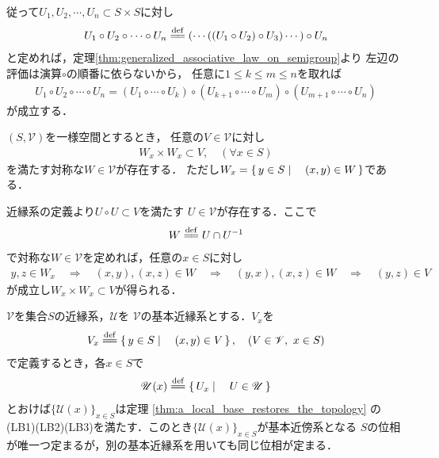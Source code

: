 	従って$U_1,U_2,\cdots,U_n \subset S \times S$に対し
	\begin{align}
		U_1 \circ U_2 \circ \cdots \circ U_n
		\defeq (\cdots((U_1 \circ U_2) \circ U_3) \cdots ) \circ U_n
	\end{align}
	と定めれば，定理\ref{thm:generalized_associative_law_on_semigroup}より
	左辺の評価は演算$\circ$の順番に依らないから，
	任意に$1 \leq k \leq m \leq n$を取れば
	\begin{align}
		U_1 \circ U_2 \circ \cdots \circ U_n
		= (U_1 \circ \cdots \circ U_k) 
		\circ (U_{k+1} \circ \cdots \circ U_m)
		\circ (U_{m+1} \circ \cdots \circ U_n)
	\end{align}
	が成立する．
	
	\begin{screen}
		\begin{thm}\label{thm:uniform_structure}
			$(S,\mathscr{V})$を一様空間とするとき，
			任意の$V \in \mathscr{V}$に対し
			\begin{align}
				W_x \times W_x \subset V,\quad (\forall x \in S)
			\end{align}
			を満たす対称な$W \in \mathscr{V}$が存在する．
			ただし$W_x = \left\{\, y \in S \mid \quad (x,y) \in W\, \right\}$である．
		\end{thm}
	\end{screen}
	
	\begin{prf}
		近縁系の定義より$U \circ U \subset V$を満たす
		$U \in \mathscr{V}$が存在する．ここで
		\begin{align}
			W \defeq U \cap U^{-1}
		\end{align}
		で対称な$W \in \mathscr{V}$を定めれば，任意の$x \in S$に対し
		\begin{align}
			y,z \in W_x \quad \Longrightarrow \quad
			(x,y),(x,z) \in W \quad \Longrightarrow \quad
			(y,x),(x,z) \in W \quad \Longrightarrow \quad
			(y,z) \in V
		\end{align}
		が成立し$W_x \times W_x \subset V$が得られる．
		\QED
	\end{prf}
	
	\begin{screen}
		\begin{thm}[近縁系で導入する位相]\label{thm:topology_induced_by_the_uniformity}
			$\mathscr{V}$を集合$S$の近縁系，$\mathscr{U}$を
			$\mathscr{V}$の基本近縁系とする．$V_x$を
			\begin{align}
				V_x \defeq \Set{y \in S}{(x,y) \in V},
				\quad (V \in \mathscr{V},\ x \in S)
			\end{align}
			で定義するとき，各$x \in S$で
			\begin{align}
				\mathscr{U}(x) \defeq \Set{U_x}{U \in \mathscr{U}}
			\end{align}
			とおけば$\{\mathscr{U}(x)\}_{x \in S}$は定理
			\ref{thm:a_local_base_restores_the_topology}
			の(LB1)(LB2)(LB3)を満たす．このとき$\{\mathscr{U}(x)\}_{x \in S}$が基本近傍系となる
			$S$の位相が唯一つ定まるが，別の基本近縁系を用いても同じ位相が定まる．
		\end{thm}
	\end{screen}
	

